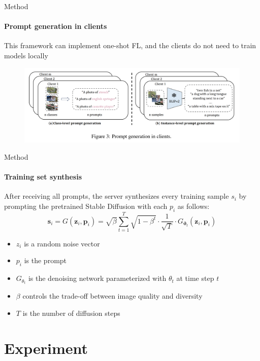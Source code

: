 \documentclass{beamer}
\begin{document}
\begin{frame}{Method}
\framesubtitle{Prompt generation in clients}
This framework can implement one-shot FL, and the clients do not need to train models locally
\begin{figure}
			\centering
			\includegraphics[width=1.0\textwidth]
			{assets/prompt}
		\end{figure}
\end{frame}

\begin{frame}{Method}
\framesubtitle{Training set synthesis}
After receiving all prompts, the server synthesizes every training sample $s_i$ by prompting the pretrained Stable Diffusion with each $p_i$ as follows:
$$
\boldsymbol{s}_i=G\left(\boldsymbol{z}_i, \boldsymbol{p}_i\right)=\sqrt{\beta} \sum_{t=1}^T \sqrt{1-\beta^t} \cdot \frac{1}{\sqrt{T}} \cdot G_{\boldsymbol{\vartheta}_t}\left(\boldsymbol{z}_i, \boldsymbol{p}_i\right)
$$
\begin{itemize}
		\item $z_i$ is a random noise vector
		\item $p_i$ is the prompt
		\item $G_{\theta_t}$ is the denoising network parameterized with $\theta_t$ at time step $t$
		\item $\beta$ controls the trade-off between image quality and diversity
		\item $T$ is the number of diffusion steps
\end{itemize}
\end{frame}

\section{Experiment}
\end{document}

